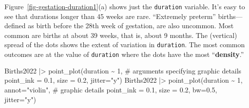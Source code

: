 \documentclass[
  letterpaper,
  DIV=11,
  numbers=noendperiod,
  oneside]{scrartcl}
\newenvironment{Shaded}{\begin{snugshade}}{\end{snugshade}}
\newcommand{\AttributeTok}[1]{\textcolor[rgb]{0.40,0.45,0.13}{#1}}
\newcommand{\CommentTok}[1]{\textcolor[rgb]{0.37,0.37,0.37}{#1}}
\newcommand{\DecValTok}[1]{\textcolor[rgb]{0.68,0.00,0.00}{#1}}
\newcommand{\FloatTok}[1]{\textcolor[rgb]{0.68,0.00,0.00}{#1}}
\newcommand{\FunctionTok}[1]{\textcolor[rgb]{0.28,0.35,0.67}{#1}}
\newcommand{\NormalTok}[1]{\textcolor[rgb]{0.00,0.23,0.31}{#1}}
\newcommand{\SpecialCharTok}[1]{\textcolor[rgb]{0.37,0.37,0.37}{#1}}
\newcommand{\StringTok}[1]{\textcolor[rgb]{0.13,0.47,0.30}{#1}}
\begin{document}
Figure~\ref{fig-gestation-duration1}(a) shows just the \texttt{duration}
variable. {} It's easy to see
that durations longer than 45 weeks are rare. ``Extremely preterm''
births---defined as birth before the 28th week of gestation, are also
uncommon. Most common are births at about 39 weeks, that is, about 9
months. The (vertical) spread of the dots shows the extent of variation
in \texttt{duration}. The most common outcomes are at the value of
\texttt{duration} where the dots have the most ``\textbf{density}.''

\begin{Shaded}
\begin{Highlighting}[]
\NormalTok{Births2022 }\SpecialCharTok{|\textgreater{}} 
  \FunctionTok{point\_plot}\NormalTok{(duration }\SpecialCharTok{\textasciitilde{}} \DecValTok{1}\NormalTok{,}
             \CommentTok{\# arguments specifying graphic details}
             \AttributeTok{point\_ink =} \FloatTok{0.1}\NormalTok{, }\AttributeTok{size =} \FloatTok{0.2}\NormalTok{, }\AttributeTok{jitter=}\StringTok{"y"}\NormalTok{)}
\NormalTok{Births2022 }\SpecialCharTok{|\textgreater{}} 
  \FunctionTok{point\_plot}\NormalTok{(duration }\SpecialCharTok{\textasciitilde{}} \DecValTok{1}\NormalTok{, }\AttributeTok{annot=}\StringTok{"violin"}\NormalTok{,}
             \CommentTok{\# graphic details}
             \AttributeTok{point\_ink =} \FloatTok{0.1}\NormalTok{, }\AttributeTok{size =} \FloatTok{0.2}\NormalTok{, }\AttributeTok{bw=}\FloatTok{0.5}\NormalTok{, }\AttributeTok{jitter=}\StringTok{"y"}\NormalTok{) }
\end{Highlighting}
\end{Shaded}
\end{document}
